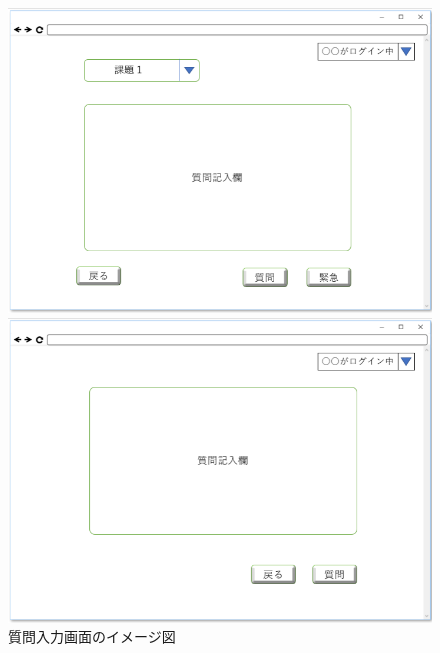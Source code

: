 \begin{figure}[htbp]
 \begin{minipage}{0.5\hsize}
  \begin{center}
   \includegraphics[width=1\linewidth,clip]{./img/36.png}
  \end{center}

 \end{minipage}
 \begin{minipage}{0.5\hsize}
  \begin{center}
   \includegraphics[width=1\linewidth,clip]{./img/37.png}
  \end{center}
 \end{minipage}
 \caption{質問入力画面のイメージ図}\label{fig:36}
\end{figure}

\newpage
